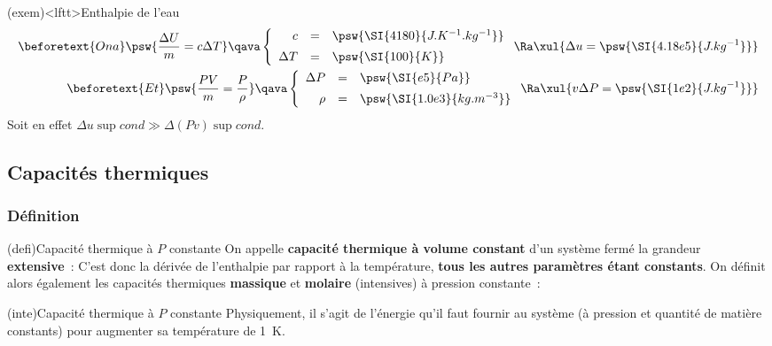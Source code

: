 \documentclass[../../main/main.tex]{subfiles}
\begin{document}
\begin{tcb}(exem)<lftt>{Enthalpie de l'eau}
	\begin{align*}
		\beforetext{On a}
		\psw{\frac{\Delta{U}}{m} = c\Delta{T}}
		\qava
		\left\{
		\begin{array}{rcl}
			c         & = & \psw{\SI{4180}{J.K^{-1}.kg^{-1}}}
			\\[.5em]
			\Delta{T} & = & \psw{\SI{100}{K}}
		\end{array}
		\right.
		\Ra
		\xul{
			\Delta{u} = \psw{\SI{4.18e5}{J.kg^{-1}}}
		}
		\\\beforetext{Et}
		\psw{\frac{PV}{m} = \frac{P}{\rho}}
		\qava
		\left\{
		\begin{array}{rcl}
			\Delta{P} & = & \psw{\SI{e5}{Pa}}
			\\[.5em]
			\rho      & = & \psw{\SI{1.0e3}{kg.m^{-3}}}
		\end{array}
		\right.
		\Ra
		\xul{
			v\Delta{P} = \psw{\SI{1e2}{J.kg^{-1}}}
		}
	\end{align*}
	Soit en effet $\Delta{u}\sup{cond} \gg \Delta{(Pv)}\sup{cond}$.
\end{tcb}

\subsection{Capacités thermiques}

\subsubsection{Définition}

\begin{tcb*}[label=defi:cp, sidebyside](defi){Capacité thermique à $P$ constante}
	On appelle \textbf{capacité thermique à volume constant} d'un système fermé la
	grandeur \textbf{extensive}~:
	\psw{%
		\[
			\boxed{C_P = \pdv{H}{T}}
		\]
	}%
	C'est donc la dérivée de l'enthalpie par rapport à la température,
	\textbf{tous les autres paramètres étant constants}.
	\tcblower
	On définit alors également les capacités thermiques \textbf{massique} et
	\textbf{molaire} (intensives) à pression constante~:
	\psw{%
		\[
			c_V = \frac{C_V}{m}
			\qqet
			C_{V,m} = \frac{C_V}{n}
		\]
	}%
\end{tcb*}

\begin{tcb}(inte){Capacité thermique à $P$ constante}
	Physiquement, il s’agit de l’énergie qu’il faut fournir au système (à pression
	et quantité de matière constants) pour augmenter sa température de \SI{1}{K}.
\end{tcb}
\end{document}
